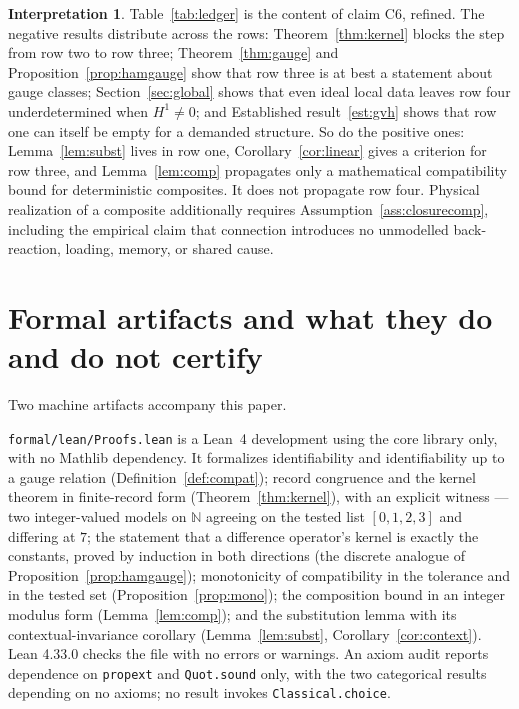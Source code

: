 \documentclass[11pt]{article}
\theoremstyle{definition}
\newtheorem{interpretation}[definition]{Interpretation}
\begin{document}
\begin{interpretation}
\label{int:ladder}
Table~\ref{tab:ledger} is the content of claim C6, refined. The negative results
distribute across the rows: Theorem~\ref{thm:kernel} blocks the step from row
two to row three; Theorem~\ref{thm:gauge} and Proposition~\ref{prop:hamgauge}
show that row three is at best a statement about gauge classes;
Section~\ref{sec:global} shows that even ideal local data leaves row four
underdetermined when $H^1\neq0$; and Established result~\ref{est:gvh} shows that
row one can itself be empty for a demanded structure. So do the positive ones:
Lemma~\ref{lem:subst} lives in row one, Corollary~\ref{cor:linear} gives a
criterion for row three, and Lemma~\ref{lem:comp} propagates only a mathematical
compatibility bound for deterministic composites. It does not propagate row
four. Physical realization of a composite additionally requires
Assumption~\ref{ass:closurecomp}, including the empirical claim that connection
introduces no unmodelled back-reaction, loading, memory, or shared cause.
\end{interpretation}

\section{Formal artifacts and what they do and do not certify}
\label{sec:formal}

Two machine artifacts accompany this paper.

\texttt{formal/lean/Proofs.lean} is a Lean~4 development \cite{Lean4} using the
core library only, with no Mathlib dependency. It formalizes identifiability and
identifiability up to a gauge relation (Definition~\ref{def:compat}); record
congruence and the kernel theorem in finite-record form
(Theorem~\ref{thm:kernel}), with an explicit witness --- two integer-valued
models on $\mathbb N$ agreeing on the tested list $[0,1,2,3]$ and differing at
$7$; the statement that a difference operator's kernel is exactly the constants,
proved by induction in both directions (the discrete analogue of
Proposition~\ref{prop:hamgauge}); monotonicity of compatibility in the tolerance
and in the tested set (Proposition~\ref{prop:mono}); the composition bound in an
integer modulus form (Lemma~\ref{lem:comp}); and the substitution lemma with its
contextual-invariance corollary (Lemma~\ref{lem:subst},
Corollary~\ref{cor:context}). Lean 4.33.0 checks the file with no errors or
warnings. An axiom audit reports dependence on \texttt{propext} and
\texttt{Quot.sound} only, with the two categorical results depending on no
axioms; no result invokes \texttt{Classical.choice}.
\end{document}
